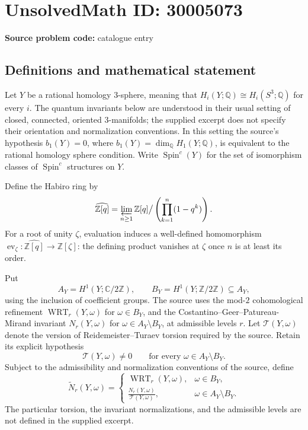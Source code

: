 \documentclass[11pt]{article}
\newcommand{\Z}{\mathbb{Z}}
\newcommand{\Q}{\mathbb{Q}}
\newcommand{\C}{\mathbb{C}}
\begin{document}
\section*{UnsolvedMath ID: 30005073}
\textbf{Source problem code:} catalogue entry
\subsection{Definitions and mathematical statement}
Let \(Y\) be a rational homology \(3\)-sphere, meaning that \(H_i(Y;\Q)\cong H_i(S^3;\Q)\) for every \(i\). The quantum invariants below are understood in their usual setting of closed, connected, oriented \(3\)-manifolds; the supplied excerpt does not specify their orientation and normalization conventions. In this setting the source's hypothesis \(b_1(Y)=0\), where \(b_1(Y)=\dim_{\Q}H_1(Y;\Q)\), is equivalent to the rational homology sphere condition. Write \(\operatorname{Spin}^c(Y)\) for the set of isomorphism classes of \(\operatorname{Spin}^c\) structures on \(Y\).

Define the Habiro ring by
\[
\widehat{\Z[q]}=\varprojlim_{n\geq1}\Z[q]\big/\left(\prod_{k=1}^{n}(1-q^k)\right).
\]
For a root of unity \(\zeta\), evaluation induces a well-defined homomorphism \(\operatorname{ev}_{\zeta}:\widehat{\Z[q]}\to\Z[\zeta]\): the defining product vanishes at \(\zeta\) once \(n\) is at least its order.

Put
\[
A_Y=H^1(Y;\C/2\Z),\qquad B_Y=H^1(Y;\Z/2\Z)\subseteq A_Y,
\]
using the inclusion of coefficient groups. The source uses the mod-\(2\) cohomological refinement \(\operatorname{WRT}_r(Y,\omega)\) for \(\omega\in B_Y\), and the Costantino--Geer--Patureau-Mirand invariant \(N_r(Y,\omega)\) for \(\omega\in A_Y\setminus B_Y\), at admissible levels \(r\). Let \(\mathcal T(Y,\omega)\) denote the version of Reidemeister--Turaev torsion required by the source. Retain its explicit hypothesis
\[
\mathcal T(Y,\omega)\ne0\qquad\text{for every }\omega\in A_Y\setminus B_Y.
\]
Subject to the admissibility and normalization conventions of the source, define
\[
\widetilde N_r(Y,\omega)=
\begin{cases}
\operatorname{WRT}_r(Y,\omega),&\omega\in B_Y,\\[2pt]
\displaystyle\frac{N_r(Y,\omega)}{\mathcal T(Y,\omega)},&\omega\in A_Y\setminus B_Y.
\end{cases}
\]
The particular torsion, the invariant normalizations, and the admissible levels are not defined in the supplied excerpt.
\end{document}
